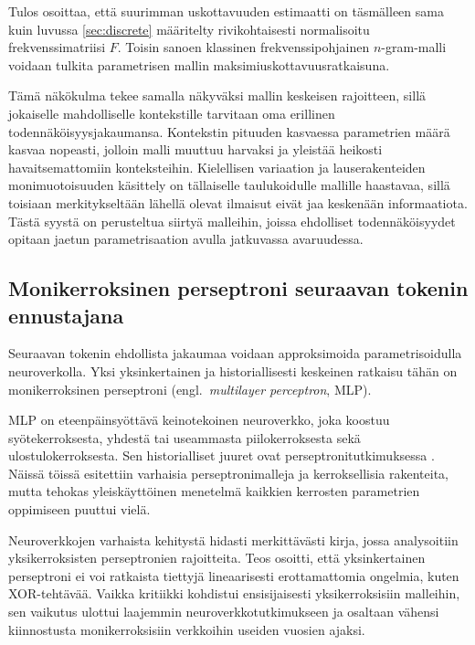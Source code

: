 Tulos osoittaa, että suurimman uskottavuuden estimaatti on täsmälleen sama kuin
luvussa \ref{sec:discrete} määritelty rivikohtaisesti normalisoitu
frekvenssimatriisi \(F\). Toisin sanoen klassinen frekvenssipohjainen
\(n\)-gram-malli voidaan tulkita parametrisen mallin
maksimiuskottavuusratkaisuna.

Tämä näkökulma tekee samalla näkyväksi mallin keskeisen rajoitteen, sillä jokaiselle
mahdolliselle kontekstille tarvitaan oma erillinen todennäköisyysjakaumansa.
Kontekstin pituuden kasvaessa parametrien määrä kasvaa nopeasti, jolloin malli
muuttuu harvaksi ja yleistää heikosti havaitsemattomiin konteksteihin.
Kielellisen variaation ja lauserakenteiden monimuotoisuuden käsittely on tällaiselle
taulukoidulle mallille haastavaa, sillä toisiaan merkitykseltään lähellä olevat
ilmaisut eivät jaa keskenään informaatiota. Tästä syystä on perusteltua siirtyä
malleihin, joissa ehdolliset todennäköisyydet opitaan jaetun parametrisaation avulla
jatkuvassa avaruudessa.

\subsection{Monikerroksinen perseptroni seuraavan tokenin ennustajana}

Seuraavan tokenin ehdollista jakaumaa voidaan
approksimoida parametrisoidulla neuroverkolla. Yksi yksinkertainen ja
historiallisesti keskeinen ratkaisu tähän on monikerroksinen perseptroni
(engl.\ \emph{multilayer perceptron}, MLP).

MLP on eteenpäinsyöttävä keinotekoinen neuroverkko, joka koostuu
syötekerroksesta, yhdestä tai useammasta piilokerroksesta sekä
ulostulokerroksesta. Sen historialliset juuret ovat perseptronitutkimuksessa \cite{rosenblatt1958perceptron,rosenblatt1962principles}. Näissä töissä esitettiin varhaisia
perseptronimalleja ja kerroksellisia rakenteita, mutta tehokas yleiskäyttöinen
menetelmä kaikkien kerrosten parametrien oppimiseen puuttui vielä.

Neuroverkkojen varhaista kehitystä hidasti merkittävästi kirja, jossa analysoitiin yksikerroksisten
perseptronien rajoitteita\cite{minsky1969perceptrons}. Teos osoitti, että yksinkertainen perseptroni ei voi
ratkaista tiettyjä lineaarisesti erottamattomia ongelmia, kuten XOR-tehtävää.
Vaikka kritiikki kohdistui ensisijaisesti yksikerroksisiin malleihin, sen
vaikutus ulottui laajemmin neuroverkkotutkimukseen ja osaltaan vähensi
kiinnostusta monikerroksisiin verkkoihin useiden vuosien ajaksi.

